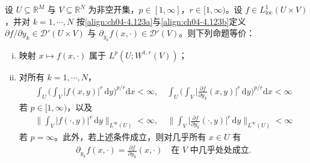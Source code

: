 \documentclass[../../main.tex]{subfiles}%
\begin{document}
\begin{proposition}\label{proposition:ch04-Sobolev嵌入}
设 $U\subseteq\mathbb{R}^M$ 与 $V\subseteq\mathbb{R}^N$ 为非空开集，$p\in[1,\infty]$，$r\in[1,\infty)$。设 $f\in L^1_{\mathrm{loc}}(U\times V)$，并对 $k=1,\cdots ,N$ 按\eqref{align:ch04-4.123a}与\eqref{align:ch04-4.123b}定义 $\partial f/\partial y_k\in\mathcal{D}'(U\times V)$ 与 $\partial_{y_k}f(x,\cdot)\in\mathcal{D}'(V)$。则下列命题等价：
\begin{enumerate}[(i)]
\item\label{item:ch04-Sobolev嵌入-i} 映射 $x\mapsto f(x,\cdot)$ 属于 $L^p(U;W^{1,r}(V))$；
\item\label{item:ch04-Sobolev嵌入-ii} 对所有 $k=1,\cdots ,N$，
\begin{align}
\int_U\Big(\int_V|f(x,y)|^r\,\mathrm{d}y\Big)^{p/r}\mathrm{d}x<\infty,\quad
\int_U\Big(\int_V\Big|\frac{\partial f}{\partial y_k}(x,y)\Big|^r\,\mathrm{d}y\Big)^{p/r}\mathrm{d}x<\infty \label{align:ch04-4.124a}
\end{align}
若 $p\in[1,\infty)$，以及
\begin{align}
\Big\|\int_V|f(\cdot,y)|^r\,\mathrm{d}y\Big\|_{L^\infty(U)}<\infty,\quad
\Big\|\int_V\Big|\frac{\partial f}{\partial y_k}(\cdot,y)\Big|^r\,\mathrm{d}y\Big\|_{L^\infty(U)}<\infty \label{align:ch04-4.124b}
\end{align}
若 $p=\infty$。此外，若上述条件成立，则对几乎所有 $x\in U$ 有
\begin{align}
\partial_{y_k}f(x,\cdot)=\frac{\partial f}{\partial y_k}(x,\cdot)\quad\text{在 }V\text{ 中几乎处处成立}. \label{align:ch04-4.125}
\end{align}
\end{enumerate}
\end{proposition}
\end{document}
